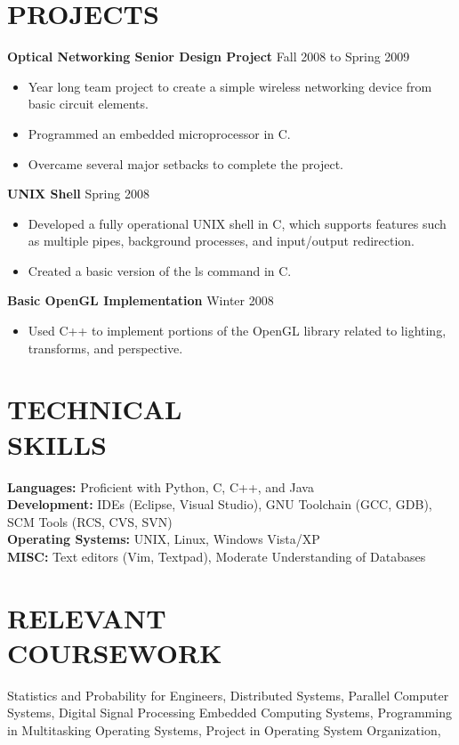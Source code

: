 \documentclass[10pt,line,margin]{res}
\begin{document}
\begin{resume}
\section {PROJECTS}
    {\bf Optical Networking Senior Design Project} \hfill Fall 2008 to Spring 2009
    \begin{itemize} \itemsep -2pt
    \item Year long team project to create a simple wireless
    networking device from basic circuit elements.
    \item Programmed an embedded microprocessor in C.
    \item Overcame several major setbacks to complete the project.
    \end{itemize}

    {\bf UNIX Shell} \hfill Spring 2008
    \begin{itemize} \itemsep -2pt
    \item Developed a fully operational UNIX shell in C, which
    supports features such as multiple pipes, background processes,
    and input/output redirection.
    \item Created a basic version of the ls command in C.
    \end{itemize}

    {\bf Basic OpenGL Implementation} \hfill Winter 2008
    \begin{itemize} \itemsep -2pt
    \item Used C++ to implement portions of the OpenGL library
    related to lighting, transforms, and perspective.
    \end{itemize}

\section{TECHNICAL \\ SKILLS}
    {\bf Languages:} Proficient with Python, C, C++, and Java \\
    {\bf Development:} IDEs (Eclipse, Visual Studio), GNU
    Toolchain (GCC, GDB), \\ SCM Tools (RCS, CVS, SVN) \\
    {\bf Operating Systems:} UNIX, Linux, Windows Vista/XP \\
    {\bf MISC:} Text editors (Vim, Textpad), Moderate Understanding 
    of Databases

\section {RELEVANT \\ COURSEWORK}
    Statistics and Probability for Engineers,
    Distributed Systems, Parallel Computer Systems, Digital
    Signal Processing Embedded Computing Systems, Programming
    in Multitasking Operating Systems, Project in Operating
    System Organization,

\end{resume}
\end{document}
